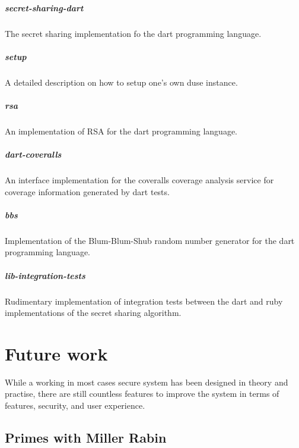 \paragraph{secret-sharing-dart} The secret sharing implementation fo the
dart programming language.

\paragraph{setup} A detailed description on how to setup one's own duse
instance.

\paragraph{rsa} An implementation of RSA for the dart programming language.

\paragraph{dart-coveralls} An interface implementation for the coveralls
coverage analysis service for coverage information generated by dart tests.

\paragraph{bbs} Implementation of the Blum-Blum-Shub random number generator
for the dart programming language.

\paragraph{lib-integration-tests} Rudimentary implementation of integration
tests between the dart and ruby implementations of the secret sharing algorithm.

\chapter{Future work}

While a working in most cases secure system has been designed in theory and
practise, there are still countless features to improve the system in terms of
features, security, and user experience.

\section{Primes with Miller Rabin}

